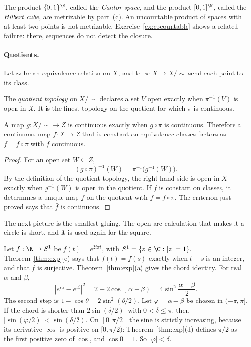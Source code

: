 The product $\{0,1\}^\N$, called the \emph{Cantor space}, and the product $[0,1]^\N$, called the \emph{Hilbert cube}, are metrizable by part~(c). An uncountable product of spaces with at least two points is not metrizable. Exercise~\ref{ex:cocountable} shows a related failure: there, sequences do not detect the closure.

\paragraph{Quotients.}
Let $\sim$ be an equivalence relation on $X$, and let $\pi:X\to X/{\sim}$ send each point to its class.

\begin{definition}
The \emph{quotient topology} on $X/{\sim}$ declares a set $V$ open exactly when $\pi^{-1}(V)$ is open in $X$. It is the finest topology on the quotient for which $\pi$ is continuous.
\end{definition}

\begin{proposition}\label{prop:quotient}
A map $g:X/{\sim}\to Z$ is continuous exactly when $g\circ\pi$ is continuous. Therefore a continuous map $f:X\to Z$ that is constant on equivalence classes factors as $f=\bar f\circ\pi$ with $\bar f$ continuous.
\end{proposition}
\begin{proof}
For an open set $W\subseteq Z$,
\[
(g\circ\pi)^{-1}(W)=\pi^{-1}\bigl(g^{-1}(W)\bigr).
\]
By the definition of the quotient topology, the right-hand side is open in $X$ exactly when $g^{-1}(W)$ is open in the quotient. If $f$ is constant on classes, it determines a unique map $\bar f$ on the quotient with $f=\bar f\circ\pi$. The criterion just proved says that $\bar f$ is continuous.
\end{proof}

The next picture is the smallest gluing. The open-arc calculation that makes it a circle is short, and it is used again for the square.

Let $f:\R\to S^1$ be $f(t)=e^{2i\pi t}$, with $S^1=\{z\in\C:|z|=1\}$. Theorem~\ref{thm:exp}(e) says that $f(t)=f(s)$ exactly when $t-s$ is an integer, and that $f$ is surjective. Theorem~\ref{thm:exp}(a) gives the chord identity. For real $\alpha$ and $\beta$,
\[
|e^{i\alpha}-e^{i\beta}|^2=2-2\cos(\alpha-\beta)=4\sin^2\frac{\alpha-\beta}2.
\]
The second step is $1-\cos\theta=2\sin^2(\theta/2)$. Let $\varphi=\alpha-\beta$ be chosen in $(-\pi,\pi]$. If the chord is shorter than $2\sin(\delta/2)$, with $0<\delta\le\pi$, then $|\sin(\varphi/2)|<\sin(\delta/2)$. On $[0,\pi/2]$ the sine is strictly increasing, because its derivative $\cos$ is positive on $[0,\pi/2)$: Theorem~\ref{thm:exp}(d) defines $\pi/2$ as the first positive zero of $\cos$, and $\cos0=1$. So $|\varphi|<\delta$.

